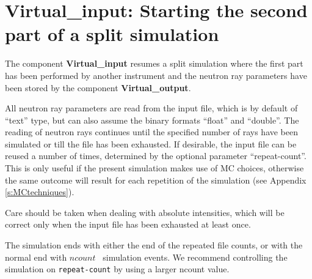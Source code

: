 \section{Virtual\_input: Starting the second part of a split simulation}
\label{virtual_input}


The component {\bf Virtual\_input} resumes a split simulation where the
first part has been performed by another instrument and the neutron ray
parameters have been stored by the component {\bf Virtual\_output}.

All neutron ray parameters are read from the input file, which is by default
of ``text'' type, but can also assume the binary formats
``float'' and ``double''. The reading of neutron rays continues until the
specified number of rays have been simulated or
till the file has been exhausted. If desirable, the input file
can be reused a number of times, determined by the optional parameter
``repeat-count''. This is only useful if the present simulation makes use of
MC choices, otherwise the same outcome will result for each repetition of the
simulation (see Appendix \ref{s:MCtechniques}).

Care should be taken when dealing with
absolute intensities, which will be correct only
when the input file has been exhausted at least once.

The simulation ends with either the end of the repeated file counts,
or with the normal end with $ncount$ \MCX\ simulation events. We recommend
controlling the simulation on \verb+repeat-count+ by using
a larger ncount value.
